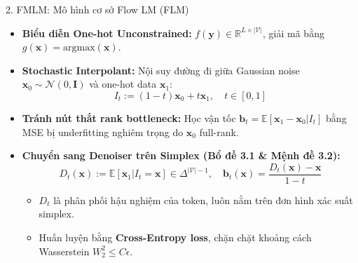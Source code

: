 \begin{frame}{2. FMLM: Mô hình cơ sở Flow LM (FLM)}
    \begin{itemize}
        \item \textbf{Biểu diễn One-hot Unconstrained:} $f(\mathbf{y}) \in \mathbb{R}^{L \times |\mathcal{V}|}$, giải mã bằng $g(\mathbf{x}) = \text{argmax}(\mathbf{x})$.
        \item \textbf{Stochastic Interpolant:} Nội suy đường đi giữa Gaussian noise $\mathbf{x}_0 \sim \mathcal{N}(0, \mathbf{I})$ và one-hot data $\mathbf{x}_1$:
        $$I_t := (1 - t)\mathbf{x}_0 + t\mathbf{x}_1, \quad t \in [0, 1]$$
        \item \textbf{Tránh nút thắt rank bottleneck:} Học vận tốc $\mathbf{b}_t = \mathbb{E}[\mathbf{x}_1 - \mathbf{x}_0 | I_t]$ bằng MSE bị underfitting nghiêm trọng do $\mathbf{x}_0$ full-rank.
        \item \textbf{Chuyển sang Denoiser trên Simplex (Bổ đề 3.1 \& Mệnh đề 3.2):}
        $$D_t(\mathbf{x}) := \mathbb{E}[\mathbf{x}_1 | I_t = \mathbf{x}] \in \Delta^{|\mathcal{V}|-1}, \quad \mathbf{b}_t(\mathbf{x}) = \frac{D_t(\mathbf{x}) - \mathbf{x}}{1 - t}$$
        \begin{itemize}
            \item $D_t$ là phân phối hậu nghiệm của token, luôn nằm trên đơn hình xác suất simplex.
            \item Huấn luyện bằng \textbf{Cross-Entropy loss}, chặn chặt khoảng cách Wasserstein $W_2^2 \le C\epsilon$.
        \end{itemize}
    \end{itemize}
\end{frame}


